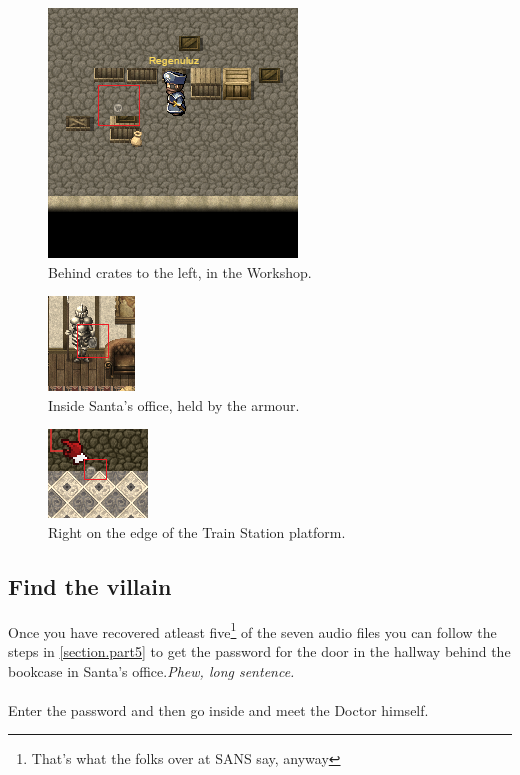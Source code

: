 \documentclass[writeup.tex]{subfiles}
\begin{document}
			\begin{figure}[H]
				\centering
				\includegraphics[scale=1]{"screenshots/coins/Netcoin 1978 - Workshop - behind crates"}
				\caption{Behind crates to the left, in the Workshop.}
			\end{figure}
			
			\begin{figure}[H]
				\centering
				\includegraphics[scale=1]{"screenshots/coins/Netcoin 1978 - Workshop - Santa's Office"}
				\caption{Inside Santa's office, held by the armour.}
			\end{figure}
			
			\begin{figure}[H]
				\centering
				\includegraphics[scale=1]{"screenshots/coins/Netcoin 1978 - Workshop - Train Station"}
				\caption{Right on the edge of the Train Station platform.}
			\end{figure}
		
	\subsection{Find the villain} \label{subsection.quest_find_the_villian}
		Once you have recovered atleast five\footnote{That's what the folks over at SANS say, anyway} of the seven audio files you can follow the steps in \autoref{section.part5} to get the password for the door in the hallway behind the bookcase in Santa's office.\textit{Phew, long sentence.}\\
		\\
		Enter the password and then go inside and meet the Doctor himself.
			
\end{document}
